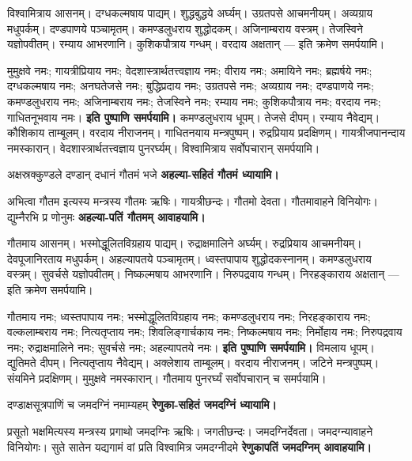 विश्वामित्राय आसनम्। दग्धकल्मषाय पाद्यम्। शुद्धबुद्धये अर्घ्यम्। उग्रतपसे
आचमनीयम्। अव्यग्राय मधुपर्कम्। दण्डपाणये पञ्चामृतम्। कमण्डलुधराय
शुद्धोदकम्। अजिनाम्बराय वस्त्रम्। तेजस्विने यज्ञोपवीतम्। रम्याय आभरणानि।
कुशिकपौत्राय गन्धम्। वरदाय अक्षतान् — इति क्रमेण समर्पयामि।

मुमुक्षवे नमः; गायत्रीप्रियाय नमः; वेदशास्त्रार्थतत्त्वज्ञाय नमः; वीराय नमः; अमायिने नमः; ब्रह्मर्षये नमः; दग्धकल्मषाय नमः; अनघतेजसे नमः; बुद्धिप्रदाय नमः; उग्रतपसे नमः; अव्यग्राय नमः; दण्डपाणये नमः; कमण्डलुधराय नमः; अजिनाम्बराय नमः; तेजस्विने नमः; रम्याय नमः; कुशिकपौत्राय नमः; वरदाय नमः; गाधितनूभवाय नमः।
\textbf{इति पुष्पाणि समर्पयामि।} कमण्डलुधराय धूपम्। तेजसे दीपम्। रम्याय
नैवेद्यम्। कौशिकाय ताम्बूलम्। वरदाय नीराजनम्। गाधितनयाय मन्त्रपुष्पम्।
रुद्रप्रियाय प्रदक्षिणम्। गायत्रीजपानन्दाय नमस्कारान्। वेदशास्त्रार्थतत्त्वज्ञाय
पुनरर्घ्यम्। विश्वामित्राय सर्वोपचारान् समर्पयामि।

{अक्षस्रक्कुण्डले दण्डान् दधानं गौतमं भजे}
\textbf{अहल्या-सहितं गौतमं ध्यायामि।}

अभित्वा गौतम इत्यस्य मन्त्रस्य गौतमः ऋषिः। गायत्रीछन्दः। गौतमो देवता।
गौतमावाहने विनियोगः।
{द्युम्नैरभि प्र णोनुमः}
\textbf{अहल्या-पतिं गौतमम् आवाहयामि।}

गौतमाय आसनम्। भस्मोद्धूलितविग्रहाय पाद्यम्। रुद्राक्षमालिने अर्घ्यम्।
रुद्रप्रियाय आचमनीयम्। देवपूजानिरताय मधुपर्कम्। अहल्यापतये पञ्चामृतम्।
ध्वस्तपापाय शुद्धोदकस्नानम्। कमण्डलुधराय वस्त्रम्। सुवर्चसे यज्ञोपवीतम्।
निष्कल्मषाय आभरणानि। निरुपद्रवाय गन्धम्। निरहङ्काराय अक्षतान् — इति
क्रमेण समर्पयामि।

गौतमाय नमः; ध्वस्तपापाय नमः; भस्मोद्धूलितविग्रहाय नमः; कमण्डलुधराय नमः; निरहङ्काराय नमः; वल्कलाम्बराय नमः; नित्यतृप्ताय नमः; शिवलिङ्गार्चकाय नमः; निष्कल्मषाय नमः; निर्मोहाय नमः; निरुपद्रवाय नमः; रुद्राक्षमालिने नमः; सुवर्चसे नमः; अहल्यापतये नमः।
\textbf{इति पुष्पाणि समर्पयामि।} विमलाय धूपम्। द्युतिमते दीपम्। नित्यतृप्ताय
नैवेद्यम्। अक्लेशाय ताम्बूलम्। वरदाय नीराजनम्। जटिने मन्त्रपुष्पम्। संयमिने
प्रदक्षिणम्। मुमुक्षवे नमस्कारान्। गौतमाय पुनरर्घ्यं सर्वोपचारान् च समर्पयामि।

{दण्डाक्षसूत्रपाणिं च जमदग्निं नमाम्यहम्}
\textbf{रेणुका-सहितं जमदग्निं ध्यायामि।}

प्रसूतो भक्षमित्यस्य मन्त्रस्य प्रगाथो जमदग्निः ऋषिः। जगतीछन्दः। जमदग्निर्देवता।
जमदग्न्यावाहने विनियोगः।
{सुते सातेन यद्यगामं वां प्रति विश्वामित्र जमदग्नीदमे}
\textbf{रेणुकापतिं जमदग्निम् आवाहयामि।}

